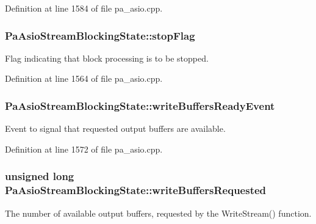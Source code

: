 Definition at line 1584 of file pa\+\_\+asio.\+cpp.

\subsubsection[{\texorpdfstring{stop\+Flag}{stopFlag}}]{ Pa\+Asio\+Stream\+Blocking\+State\+::stop\+Flag}\hypertarget{struct_pa_asio_stream_blocking_state_ad0635a7fb4c70db4dbcc4da40301fd5f}{}\label{struct_pa_asio_stream_blocking_state_ad0635a7fb4c70db4dbcc4da40301fd5f}
Flag indicating that block processing is to be stopped. 

Definition at line 1564 of file pa\+\_\+asio.\+cpp.

\subsubsection[{\texorpdfstring{write\+Buffers\+Ready\+Event}{writeBuffersReadyEvent}}]{ Pa\+Asio\+Stream\+Blocking\+State\+::write\+Buffers\+Ready\+Event}\hypertarget{struct_pa_asio_stream_blocking_state_a3e5e248be829e756ecbff62175f474fd}{}\label{struct_pa_asio_stream_blocking_state_a3e5e248be829e756ecbff62175f474fd}
Event to signal that requested output buffers are available. 

Definition at line 1572 of file pa\+\_\+asio.\+cpp.

\subsubsection[{\texorpdfstring{write\+Buffers\+Requested}{writeBuffersRequested}}]{\setlength{\rightskip}{0pt plus 5cm}unsigned long Pa\+Asio\+Stream\+Blocking\+State\+::write\+Buffers\+Requested}\hypertarget{struct_pa_asio_stream_blocking_state_a8fa83147d1da88898a4161f07eb8bc16}{}\label{struct_pa_asio_stream_blocking_state_a8fa83147d1da88898a4161f07eb8bc16}
The number of available output buffers, requested by the Write\+Stream() function. 

